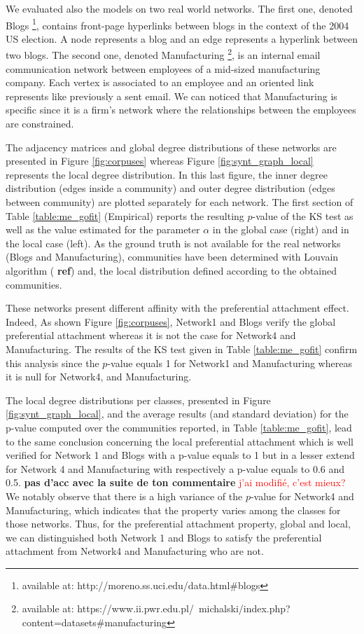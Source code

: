 We evaluated also the models on two real world networks.
The first one, denoted Blogs \footnote{available at: http://moreno.ss.uci.edu/data.html\#blogs}, contains front-page hyperlinks between blogs in the context of the 2004 US election. A node represents a blog and an edge represents a hyperlink between two blogs.
The second one, denoted Manufacturing \footnote{available at: https://www.ii.pwr.edu.pl/~michalski/index.php?content=datasets\#manufacturing}, is an internal email communication network between employees of a mid-sized manufacturing company. Each vertex is associated  to an employee and an oriented link represents like previously a sent email. We can noticed that Manufacturing is specific since it is a firm's network where the relationships between the employees are constrained. 


The adjacency matrices and global degree distributions of these networks are presented in Figure \ref{fig:corpuses} whereas Figure \ref{fig:synt_graph_local} represents the local degree distribution. In this last figure, the inner degree distribution (edges inside a community) and outer degree distribution (edges between community) are plotted separately for each network. The first section of Table \ref{table:me_gofit} (Empirical) reports the resulting $p$-value of the KS test as well as the value estimated for the parameter  $\alpha$ in the global case (right) and in the local case (left). As the ground truth is not available for the real networks (Blogs and Manufacturing), communities have been determined with Louvain algorithm ( \textbf{ref}) and, the local distribution defined according to the obtained communities. 

These networks present  different affinity with the preferential attachment effect.
Indeed, As shown Figure \ref{fig:corpuses}, Network1 and Blogs verify the  global preferential attachment whereas it is not the case for Network4 and Manufacturing. The results of the KS test given in Table \ref{table:me_gofit} confirm this analysis since the $p$-value equals 1 for Network1 and Manufacturing whereas it is null for Network4, and Manufacturing.

The local degree distributions per classes, presented in Figure \ref{fig:synt_graph_local}, and the average results (and standard deviation) for the p-value computed over the communities reported, in Table \ref{table:me_gofit}, lead to the same conclusion concerning the local preferential attachment which is well verified for Network 1 and Blogs with a p-value equals to 1 but in a lesser extend for Network 4 and Manufacturing with respectively a p-value equals to 0.6 and 0.5. \textbf{pas d'acc avec la suite de ton commentaire} \textcolor{red}{j'ai modifié, c'est mieux?} We notably observe that there is a high variance of the $p$-value for Network4 and Manufacturing, which indicates that the property varies among the classes for those networks. Thus, for the preferential attachment property, global and local, we can distinguished both Network 1 and Blogs to satisfy the preferential attachment from Network4 and Manufacturing who are not. 

